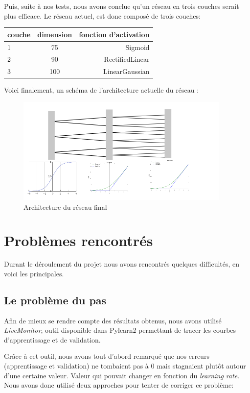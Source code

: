 \documentclass[12pt, a4paper]{article}
\begin{document}
Puis, suite à nos tests, nous avons conclue qu'un réseau en trois couches serait plus efficace. Le réseau actuel, est donc composé de trois couches: 
\newpage
\begin{center}
\begin{tabular}{|l|c|r|}
  \hline
  couche & dimension & fonction d'activation\\
  \hline
  1 & 75 & Sigmoid \\
  2 & 90 & RectifiedLinear \\
  3 & 100 & LinearGaussian \\
  \hline
\end{tabular}
\end{center}

Voici finalement, un schéma de l'architecture actuelle du réseau :

\begin{figure}[h!]
  \centering
  \includegraphics[scale=1]{Images/architecture.png}
  \caption{Architecture du réseau final}
\end{figure}
\newpage
\section{Problèmes rencontrés}
Durant le déroulement du projet nous avons rencontrés quelques difficultés, en voici les principales. 
	\subsection{Le problème du pas}
Afin de mieux se rendre compte des résultats obtenus, nous avons utilisé \emph{LiveMonitor}, outil disponible dans Pylearn2 permettant de tracer les courbes d'apprentissage et de validation. 

Grâce à cet outil, nous avons tout d'abord remarqué que nos erreurs (apprentissage et validation) ne tombaient pas à 0 mais stagnaient plutôt autour d'une certaine valeur. Valeur qui pouvait changer en fonction du \emph{learning rate}. 
Nous avons donc utilisé deux approches pour tenter de corriger ce problème:
\end{document}
